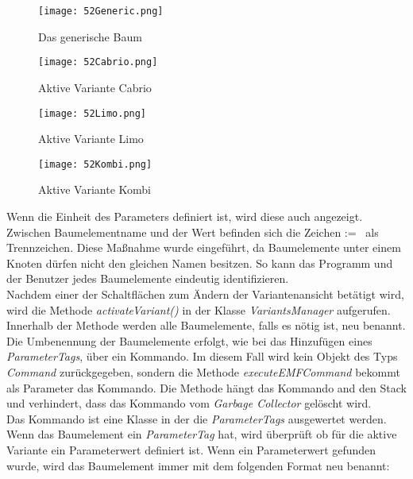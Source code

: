\begin{figure}[h!]
\centering
\begin{minipage}{.5\textwidth}
  \centering
  \texttt{[image: 52Generic.png]}
  \caption{Das generische Baum}
  \label{ttn.52Generic}
\end{minipage}%
\begin{minipage}{.5\textwidth}
  \centering
  \texttt{[image: 52Cabrio.png]}
  \caption{Aktive Variante Cabrio}
  \label{ttn.52Cabrio}
\end{minipage}
\end{figure}


\begin{figure}[h!]
\centering
\begin{minipage}{.5\textwidth}
  \centering
  \texttt{[image: 52Limo.png]}
  \caption{Aktive Variante Limo}
  \label{ttn.52Limo}
\end{minipage}%
\begin{minipage}{.5\textwidth}
  \centering
  \texttt{[image: 52Kombi.png]}
  \caption{Aktive Variante Kombi}
  \label{ttn.52Kombi}
\end{minipage}
\end{figure}


Wenn die Einheit des Parameters definiert ist, wird diese auch angezeigt. Zwischen Baumelementname und der Wert befinden sich die Zeichen \glqq :=\grqq~ als Trennzeichen. Diese Maßnahme wurde eingeführt, da Baumelemente unter einem Knoten dürfen nicht den gleichen Namen besitzen. So kann das Programm und der Benutzer jedes Baumelemente eindeutig identifizieren.\\


Nachdem einer der Schaltflächen zum Ändern der Variantenansicht betätigt wird, wird die Methode \textit{activateVariant()} in der Klasse \textit{VariantsManager} aufgerufen. Innerhalb der Methode werden alle Baumelemente, falls es nötig ist, neu benannt. \\


Die Umbenennung der Baumelemente erfolgt, wie bei das Hinzufügen eines \textit{ParameterTags}, über ein Kommando. Im diesem Fall wird kein Objekt des Typs \textit{Command} zurückgegeben, sondern die Methode \textit{executeEMFCommand} bekommt als Parameter das Kommando. Die Methode hängt das Kommando and den Stack und verhindert, dass das Kommando vom \textit{Garbage Collector} gelöscht wird.\\


Das Kommando ist eine Klasse in der die \textit{ParameterTags} ausgewertet werden. Wenn das Baumelement ein \textit{ParameterTag} hat, wird überprüft ob für die aktive Variante ein Parameterwert definiert ist. Wenn ein Parameterwert gefunden wurde, wird das Baumelement immer mit dem folgenden Format neu benannt:

